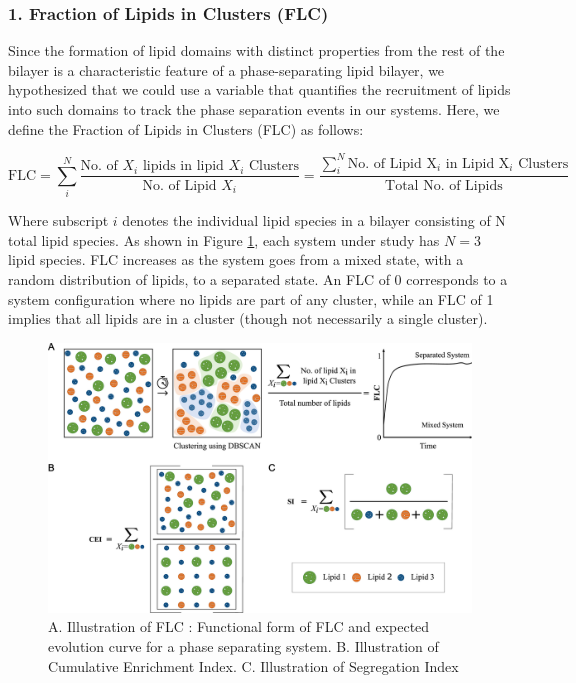 \documentclass{biophys-new}
\begin{document}
\subsubsection*{1. Fraction of Lipids in Clusters (FLC)}
Since the formation of lipid domains with distinct properties from the rest of the bilayer is a characteristic feature of a phase-separating lipid bilayer,
we hypothesized that we could use a variable that quantifies the recruitment of lipids into such domains to track the phase separation events in our systems.
Here, we define the Fraction of Lipids in Clusters (FLC) as follows:

\begin{equation}
\label{eq:FLC}
\text{FLC} = \sum_{i}^{N} \frac{\text{No. of $X_i$ lipids in lipid $X_i$ Clusters}}{\text{No. of Lipid $X_i$}} =  \frac{\sum_{i}^{N} \text{No. of Lipid X$_i$ in Lipid X$_i$ Clusters}}{\text{Total No. of Lipids}}
\end{equation}

\noindent Where subscript $i$ denotes the individual lipid species in a bilayer consisting of N total lipid species.
As shown in Figure \ref{fig2:view}, each system under study has $N=3$ lipid species.
FLC increases as the system goes from a mixed state, with a random distribution of lipids, to a separated state.
An FLC of 0 corresponds to a system configuration where no lipids are part of any cluster,
while an FLC of 1 implies that all lipids are in a cluster (though not necessarily a single cluster).


\begin{figure}[hbt!]
\centering
\includegraphics[width=6.5in]{Figures/Main/2/placeholder.jpg}
\caption{A. Illustration of FLC :  Functional form of FLC and expected evolution curve for a phase separating system. B. Illustration of Cumulative Enrichment Index. C. Illustration of Segregation Index}
\label{fig2:view}
\end{figure}
\end{document}
